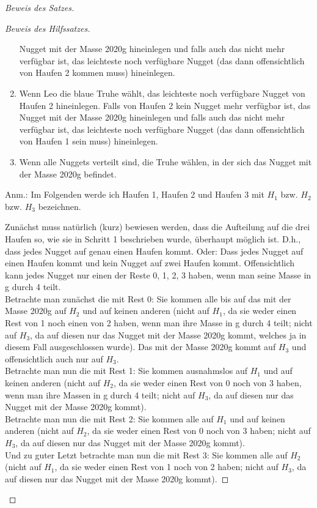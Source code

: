 \begin{proof}[Beweis des Satzes]
\begin{proof}[Beweis des Hilfssatzes]
\begin{enumerate}
            Nugget mit der Masse 2020g hineinlegen und falls auch das nicht mehr verfügbar ist, das leichteste noch 
            verfügbare Nugget (das dann offensichtlich von Haufen 2 kommen muss) hineinlegen.
            \item Wenn Leo die blaue Truhe wählt, das leichteste noch verfügbare Nugget von Haufen  2 hineinlegen. Falls 
            von Haufen 2 kein Nugget mehr verfügbar ist, das Nugget mit der Masse 2020g hineinlegen und falls auch das 
            nicht mehr verfügbar ist, das leichteste noch verfügbare Nugget (das dann offensichtlich von Haufen 1 
            sein muss) hineinlegen.
            \item Wenn alle Nuggets verteilt sind, die Truhe wählen, in der sich das Nugget mit der Masse 2020g 
            befindet.

        \end{enumerate}

        Anm.: Im Folgenden werde ich Haufen 1, Haufen 2 und Haufen 3 mit $H_1$ bzw. $H_2$ bzw. $H_3$ bezeichnen.

        Zunächst muss natürlich (kurz) bewiesen werden, dass die Aufteilung auf die drei Haufen so, wie sie in 
        Schritt 1 beschrieben wurde, überhaupt möglich ist. D.h., dass jedes Nugget auf genau einen Haufen kommt. 
        Oder: Dass jedes Nugget auf einen Haufen kommt und kein Nugget auf zwei Haufen kommt. Offensichtlich kann 
        jedes Nugget nur einen der Reste 0, 1, 2, 3 haben, wenn man seine Masse in g durch 4 teilt. \\
        Betrachte man zunächst die mit Rest 0: Sie kommen alle bis auf das mit der Masse 2020g auf $H_2$ und auf 
        keinen anderen (nicht auf $H_1$, da sie weder einen Rest von 1 noch einen von 2 haben, wenn man ihre 
        Masse in g durch 4 teilt; nicht auf $H_3$, da auf diesen nur das Nugget mit der Masse 2020g kommt, 
        welches ja in diesem Fall ausgeschlossen wurde). Das mit der Masse 2020g kommt auf $H_3$ und 
        offensichtlich auch nur auf $H_3$. \\
        Betrachte man nun die mit Rest 1: Sie kommen ausnahmslos auf $H_1$ und auf keinen anderen (nicht auf $H_2$, da sie 
        weder einen Rest von 0 noch von 3 haben, wenn man ihre Massen in g durch 4 teilt; nicht auf $H_3$, da auf 
        diesen nur das Nugget mit der Masse 2020g kommt). \\
        Betrachte man nun die mit Rest 2: Sie kommen alle auf $H_1$ und auf keinen anderen (nicht auf $H_2$, da sie weder 
        einen Rest von 0 noch von 3 haben; nicht auf $H_3$, da auf diesen nur das Nugget mit der Masse 2020g kommt). \\
        Und zu guter Letzt betrachte man nun die mit Rest 3: Sie kommen alle auf $H_2$ (nicht auf $H_1$, da sie weder 
        einen Rest von 1 noch von 2 haben; nicht auf $H_3$, da auf diesen nur das Nugget mit der Masse 2020g kommt).


\end{proof}
\end{proof}
